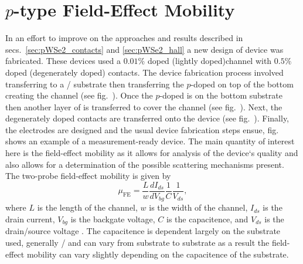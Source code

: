 \section{$p$-type  Field-Effect Mobility}\label{sec:pWSe2_hbn}
In an effort to improve on the approaches and results described in secs.~\ref{sec:pWSe2_contacts} and \ref{sec:pWSe2_hall} a new design of device was fabricated. These devices used a $0.01\%$  doped  (lightly doped)channel with $0.5\%$ doped  (degenerately doped) contacts. The device fabrication process involved transferring \hbn to a / substrate then transferring the $p$-doped  on top of the bottom \hbn creating the channel (see fig.~). Once the $p$-doped  is on the bottom \hbn substrate then another layer of \hbn is transferred to cover the channel (see fig.~). Next, the degenerately doped  contacts are transferred onto the device (see fig.~). Finally, the electrodes are designed and the usual device fabrication steps ensue, fig.~ shows an example of a measurement-ready device. The main quantity of interest here is the field-effect mobility as it allows for analysis of the device`s quality and also allows for a determination of the possible scattering mechanisms present. The two-probe field-effect mobility is given by 
\begin{equation}\label{eq:mu_fe}
	\mu_\mathrm{FE} = \frac{L}{w}\frac{d I_{ds}}{d V_{bg}}\frac{1}{C}\frac{1}{V_{ds}},
\end{equation}
where $L$ is the length of the channel, $w$ is the width of the channel, $I_{ds}$ is the drain current, $V_{bg}$ is the backgate voltage, $C$ is the capacitence, and $V_{ds}$ is the drain/source voltage \cite{Stassen_AppPhysLett2004}. The capacitence is dependent largely on the substrate used, generally / and can vary from substrate to substrate as a result the field-effect mobility can vary slightly depending on the capacitence of the substrate.  \\ \\
